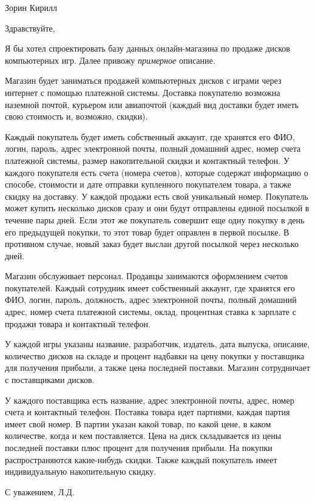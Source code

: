 \documentclass[12pt,a4paper]{letter}
\begin{document}
 
\begin{letter}{Зорин Кирилл} 
\opening{Здравствуйте,}
Я бы хотел спроектировать базу данных онлайн-магазина по продаже дисков компьютерных игр. Далее привожу \textit{примерное} описание.

Магазин будет заниматься продажей компьютерных дисков с играми через интернет с помощью платежной системы. Доставка покупателю возможна наземной почтой, курьером или авиапочтой (каждый вид доставки будет иметь свою стоимость и, возможно, скидки).

Каждый покупатель будет иметь собственный аккаунт, где хранятся его ФИО, логин, пароль, адрес электронной почты, полный домашний адрес, номер счета платежной системы, размер накопительной скидки и контактный телефон. У каждого покупателя есть счета (номера счетов), которые содержат информацию о способе, стоимости и дате отправки купленного покупателем товара, а также скидку на доставку. У каждой продажи есть свой уникальный номер. Покупатель может купить несколько дисков сразу и они будут отправлены единой посылкой в течение пары дней. Если этот же покупатель совершит еще одну покупку в день его предыдущей покупки, то этот товар будет оправлен в первой посылке. В противном случае, новый заказ будет выслан другой посылкой через несколько дней. 

Магазин обслуживает персонал. Продавцы занимаются оформлением счетов покупателей. Каждый сотрудник имеет собственный аккаунт, где хранятся его ФИО, логин, пароль, должность, адрес электронной почты, полный домашний адрес, номер счета платежной системы, оклад, процентная ставка к зарплате с продажи товара и контактный телефон.

У каждой игры указаны название, разработчик, издатель, дата выпуска, описание, количество дисков на складе и процент надбавки на цену покупки у поставщика для получения прибыли, а также цена последней поставки.
Магазин сотрудничает с поставщиками дисков. 

У каждого поставщика есть название, адрес электронной почты, адрес, номер счета и контактный телефон. Поставка товара идет партиями, каждая партия имеет свой номер. В партии указан какой товар, по какой цене, в каком количестве, когда и кем поставляется. 
Цена на диск складывается из цены последней поставки плюс процент для получения прибыли.
На покупки распространяются какие-нибудь скидки. Также каждый покупатель имеет индивидуальную накопительную скидку.
\closing{С уважением, Л.Д.} 
\end{letter} 
\end{document}
